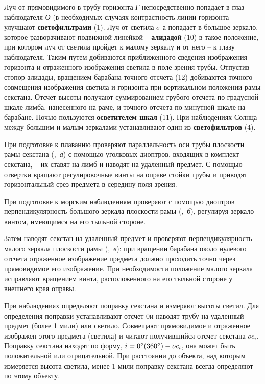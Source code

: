 Луч от прямовидимого в трубу горизонта \textit{Г} непосредственно
попадает в глаз наблюдателя \textit{О} (в необходимых случаях
контрастность линии горизонта улучшают \textbf{светофильтрами}
(1). Луч от светила $\sigma$ а попадает в большое зеркало, которое
разворачивают подвижной линейкой \--- \textbf{алидадой} (10) в такое
положение, при котором луч от светила пройдет к малому зеркалу и от
него \--- к глазу наблюдателя. Таким путем добиваются приближенного
сведения изображения горизонта и отраженного изображения светила в
поле зрения трубы. Отпустив стопор алидады, вращением барабана точного
отсчета (12) добиваются точного совмещения изображения светила и
горизонта при вертикальном положении рамы секстана. Отсчет высоты
получают суммированием грубого отсчета по градусной шкале лимба,
нанесенного на раме, и точного отсчета по минутной шкале на
барабане. Ночью пользуются \textbf{осветителем шкал} (11). При
наблюдениях Солнца между большим и малым зеркалами устанавливают один
из \textbf{светофильтров} (4).

При подготовке к плаванию проверяют параллельность оси трубы плоскости
рамы секстана (,~\textit{а}) с помощью уголковых диоптров,
входящих в комплект секстана, \--- их ставят на лимб и наводят на
удаленный предмет. С помощью отвертки вращают регулировочные винты на
оправе стойки трубы и приводят горизонтальный срез предмета в середину
поля зрения.

При подготовке к морским наблюдениям проверяют с помощью диоптров
перпендикулярность большого зеркала плоскости рамы (,~\textit{б}),
регулируя зеркало винтом, имеющимся на его тыльной стороне.

Затем наводят секстан на удаленный предмет и проверяют
перпендикулярность малого зеркала плоскости рамы (,~\textit{в}): при
вращении барабана около нулевого отсчета отраженное изображение
предмета должно проходить точно через прямовидимое его
изображение. При необходимости положение малого зеркала исправляют
вращением винта, расположенного на его тыльной стороне у внешнего края
оправы.

При наблюдениях определяют поправку секстана и измеряют высоты
светил. Для определения поправки устанавливают отсчет 0\gr и наводят
трубу на удаленный предмет (более 1 мили) или светило. Совмещают
прямовидимое и отраженное изображен этого предмета (светила) и читают
получившийся отсчет секстана $oc_i$. Поправку секстана находят по форму,
$i = 0^\circ (360^\circ) - oc_i$, она может быть положительной или
отрицательной. При расстоянии до объекта, над которым измеряется
высота светила, менее 1 мили поправку секстана всегда определяют по
этому объекту.


